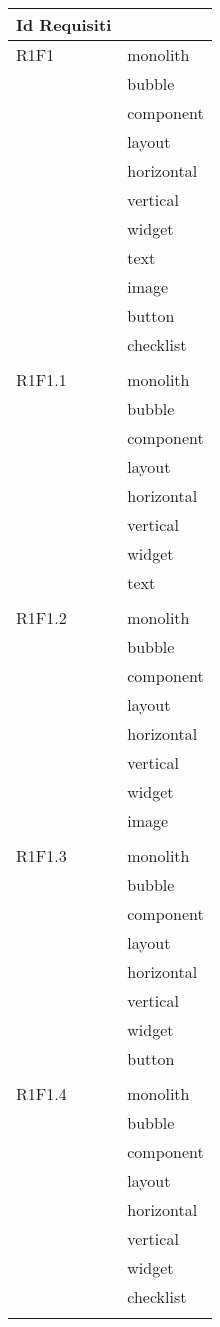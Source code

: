 \begin{center}
	\begin{longtable}{|p{7cm}|p{7cm}|}\hline
		Id Requisiti & \termine{Package} \\ \hline
		R1F1 & monolith \\ & bubble \\ & component \\ & layout \\ & horizontal \\ & vertical \\ & widget \\ & text \\ & image \\ & button \\ & checklist \\ & \\ \hline
		R1F1.1 & monolith \\ & bubble \\ & component \\ & layout \\ & horizontal \\ & vertical \\ & widget \\ & text \\ & \\ \hline
		R1F1.2 & monolith \\ & bubble \\ & component \\ & layout \\ & horizontal \\ & vertical \\ & widget \\ & image \\ & \\ \hline
		R1F1.3 & monolith \\ & bubble \\ & component \\ & layout \\ & horizontal \\ & vertical \\ & widget \\ & button \\ & \\ \hline
		R1F1.4 & monolith \\ & bubble \\ & component \\ & layout \\ & horizontal \\ & vertical \\ & widget \\ & checklist \\ & \\ \hline

\end{longtable}
\end{center}
